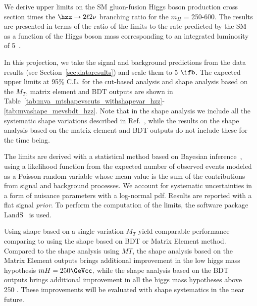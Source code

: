 We derive upper limits on the SM gluon-fusion Higgs boson production cross section 
times the $\hzz\to 2\ell2\nu$ branching ratio for the $m_H$ = 250-600\GeVcc. 
The results are presented in terms of the ratio of the limits to the rate predicted 
by the SM as a function of the Higgs boson mass corresponding to an integrated 
luminosity of 5~\ifb. 

In this projection, we take the signal and background predictions from the data results 
(see Section~\ref{sec:dataresults}) and scale them to 5 $\ifb$.
The expected upper limits at 95\% C.L. for the cut-based analysis and 
shape analysis based on the $M_T$, matrix element and BDT outputs are 
shown in Table~\ref{tab:mva_mtshapevscuts_withshapevar_hzz}-\ref{tab:mvashape_mevsbdt_hzz}.  
Note that in the shape analysis we include all the systematic shape variations 
described in Ref.~\cite{shapeananote}, while the results on the shape analysis based on 
the matrix element and BDT outputs do not include these for the time being. 

The limits are derived with a statistical method based on Bayesian
inference~\cite{bayesian}, using a likelihood function from the
expected number of observed events modeled as a Poisson random
variable whose mean value is the sum of the contributions from signal
and background processes. We account for systematic
uncertainties in a form of nuisance parameters with a log-normal
pdf. Results are reported with a flat signal {\it prior}. To perform
the computation of the limits, the software package LandS~\cite{lands}
is used.

Using shape based on a single variation $M_T$ yield comparable performance comparing 
to using the shape based on BDT or Matrix Element method. 
Compared to the shape analysis using $MT$, the shape analysis based on the
 Matrix Element outputs brings additional %
improvement in the low higgs mass hypothesis $mH=250\GeVcc$, 
while the shape analysis based on the BDT outputs brings additional %
improvement in all the higgs mass hypotheses above 250 \GeVcc. 
These improvements will be evaluated with shape systematics in the near future. 



